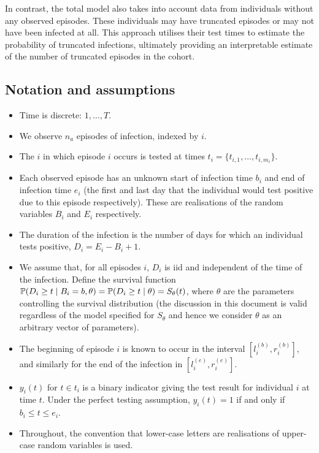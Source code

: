 \documentclass[main.tex]{subfiles}
\begin{document}
In contrast, the total model also takes into account data from individuals without any observed episodes.
These individuals may have truncated episodes or may not have been infected at all. This approach utilises their test times to estimate the probability of truncated infections, ultimately providing an interpretable estimate of the number of truncated episodes in the cohort.

\subsection{Notation and assumptions}
\begin{itemize}
\item
  Time is discrete: $1, \dots, T$.
\item
  We observe $n_a$ episodes of infection, indexed by $i$.
\item
  The $i$ in which episode $i$ occurs is tested at times
  $t_i = \{ t_{i,1}, \dots, t_{i,m_i} \}$.
\item
  Each observed episode has an unknown start of infection time $b_i$
  and end of infection time $e_i$ (the first and last day that the
  individual would test positive due to this episode respectively).
  These are realisations of the random variables $B_i$ and $E_i$
  respectively.
\item
  The duration of the infection is the number of days for which an
  individual tests positive, $D_i = E_i - B_i + 1$.
\item
  We assume that, for all episodes $i$, $D_i$ is iid and independent
  of the time of the infection. Define the survival function
  $\operatorname{\mathbb{P}}(D_i \geq t \mid B_i = b, \theta) = \operatorname{\mathbb{P}}(D_i \geq t \mid \theta) = S_\theta(t)$,
  where $\theta$ are the parameters controlling the survival
  distribution (the discussion in this document is valid regardless of
  the model specified for $S_\theta$ and hence we consider $\theta$
  as an arbitrary vector of parameters).
\item
  The beginning of episode $i$ is known to occur in the interval
  $[l_i^{(b)}, r_i^{(b)}]$, and similarly for the end of the infection
  in $[l_i^{(e)}, r_i^{(e)}]$.
\item
  $y_i(t)$ for $t \in t_i$ is a binary indicator giving the test
  result for individual $i$ at time $t$. Under the perfect testing
  assumption, $y_i(t) = 1$ if and only if $b_i \leq t \leq e_i$.
\item
  Throughout, the convention that lower-case letters are realisations of
  upper-case random variables is used.
\end{itemize}
\end{document}
